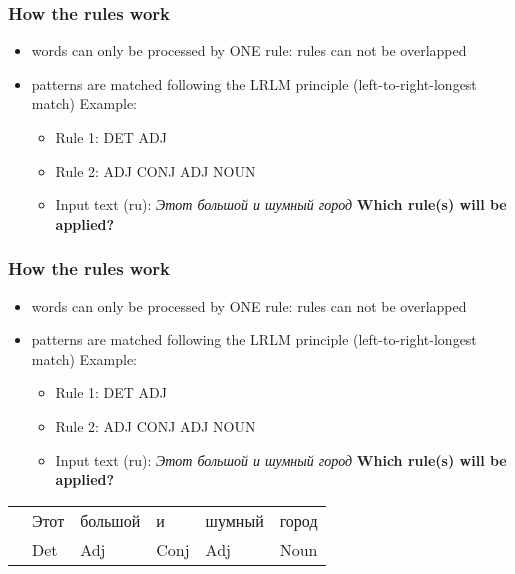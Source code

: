 \documentclass[10pt,xetex]{beamer} %
\begin{document}
\begin{frame}
\frametitle{How the rules work}
\begin{itemize}
\item words can only be processed by ONE rule: rules can not be overlapped
\item patterns are matched following the LRLM principle (left-to-right-longest match)
\newline Example:
\begin{itemize}
  \item Rule 1: DET ADJ
  \item Rule 2: ADJ CONJ ADJ NOUN
   \item Input text (ru): \emph{Этот большой и шумный город}
\newline 
\newline 
\textbf{Which rule(s) will be applied?}
\end{itemize}
\end{itemize}
\end{frame}

\begin{frame}
\frametitle{How the rules work}
\begin{itemize}
\item words can only be processed by ONE rule: rules can not be overlapped
\item patterns are matched following the LRLM principle (left-to-right-longest match)
\newline Example:
\begin{itemize}
  \item Rule 1: DET ADJ
  \item Rule 2: ADJ CONJ ADJ NOUN
   \item Input text (ru): \emph{Этот большой и шумный город}
\newline 
\newline \textbf{Which rule(s) will be applied?}
\newline
\newline
\end{itemize}
\end{itemize}
\begin{block}{}
\begin{center}
\begin{tabular}{llllll}
 & Этот   & большой   &   и &    шумный   &  город\\
 & Det  &  Adj &   Conj  &   Adj &  Noun\\
\end{tabular}
\end{center}
\end{block}

\end{frame}
\end{document}
